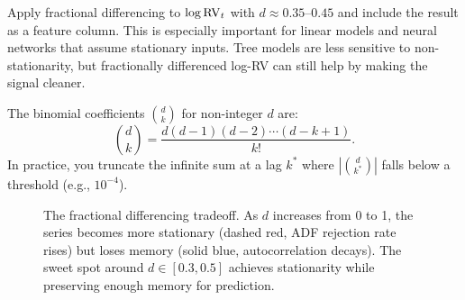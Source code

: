 \begin{projectconnection}
Apply fractional differencing to $\log \operatorname{RV}_t$ with $d \approx 0.35$--$0.45$ and include the result as a feature column. This is especially important for linear models and neural networks that assume stationary inputs. Tree models are less sensitive to non-stationarity, but fractionally differenced log-RV can still help by making the signal cleaner.
\end{projectconnection}

The binomial coefficients $\binom{d}{k}$ for non-integer $d$ are:
\[
\binom{d}{k} = \frac{d(d-1)(d-2)\cdots(d-k+1)}{k!}.
\]
In practice, you truncate the infinite sum at a lag $k^*$ where $|\binom{d}{k^*}|$ falls below a threshold (e.g., $10^{-4}$).

\begin{figure}[ht]
\centering
{}
\caption{The fractional differencing tradeoff. As $d$ increases from 0 to 1, the series becomes more stationary (dashed red, ADF rejection rate rises) but loses memory (solid blue, autocorrelation decays). The sweet spot around $d \in [0.3, 0.5]$ achieves stationarity while preserving enough memory for prediction.}
\label{fig:frac-diff}
\end{figure}

